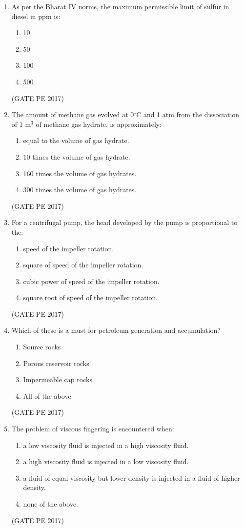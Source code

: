 \documentclass[journal,12pt,onecolumn]{IEEEtran}
\theoremstyle{remark}
\begin{document}
\begin{enumerate}[start=1, label={Q\arabic*.}]
\item As per the Bharat IV norms, the maximum permissible limit of sulfur in diesel in ppm is:
\begin{enumerate}
\item 10
\item 50
\item 100
\item 500
\end{enumerate}
\hfill{(GATE PE 2017)}

\item The amount of methane gas evolved at 0$^\circ$C and 1 atm from the dissociation of 1 m$^3$ of methane gas hydrate, is approximately:
\begin{enumerate}
\item equal to the volume of gas hydrate.
\item 10 times the volume of gas hydrate.
\item 160 times the volume of gas hydrates.
\item 300 times the volume of gas hydrates.
\end{enumerate}
\hfill{(GATE PE 2017)}

\item For a centrifugal pump, the head developed by the pump is proportional to the:
\begin{enumerate}
\item speed of the impeller rotation.
\item square of speed of the impeller rotation.
\item cubic power of speed of the impeller rotation.
\item square root of speed of the impeller rotation.
\end{enumerate}
\hfill{(GATE PE 2017)}

\item Which of these is a must for petroleum generation and accumulation?
\begin{enumerate}
\item Source rocks
\item Porous reservoir rocks
\item Impermeable cap rocks
\item All of the above
\end{enumerate}
\hfill{(GATE PE 2017)}

\item The problem of viscous fingering is encountered when:
\begin{enumerate}
\item a low viscosity fluid is injected in a high viscosity fluid.
\item a high viscosity fluid is injected in a low viscosity fluid.
\item a fluid of equal viscosity but lower density is injected in a fluid of higher density.
\item none of the above.
\end{enumerate}
\hfill{(GATE PE 2017)}


\end{enumerate}
\end{document}
